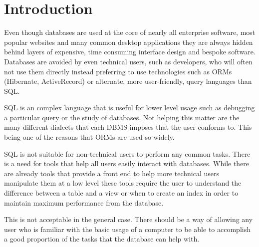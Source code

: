 \chapter{Introduction}

Even though databases are used at the core of nearly all enterprise software, most popular websites and many common desktop applications they are always hidden behind layers of expensive, time consuming interface design and bespoke software. Databases are avoided by even technical users, such as developers, who will often not use them directly instead preferring to use technologies such as \acp{ORM} (Hibernate, ActiveRecord) or alternate, more user-friendly, query languages than \ac{SQL}.

\ac{SQL} is an complex language that is useful for lower level usage such as debugging a particular query or the study of databases. Not helping this matter are the many different dialects that each \ac{DBMS} imposes that the user conforms to. This being one of the reasons that \acp{ORM} are used so widely.

\ac{SQL} is not suitable for non-technical users to perform any common tasks. There is a need for tools that help all users easily interact with databases. While there are already tools that provide a front end to help more technical users manipulate them at a low level these tools require the user to understand the difference between a table and a view or when to create an index in order to maintain maximum performance from the database.

This is not acceptable in the general case. There should be a way of allowing any user who is familiar with the basic usage of a computer to be able to accomplish a good proportion of the tasks that the database can help with.